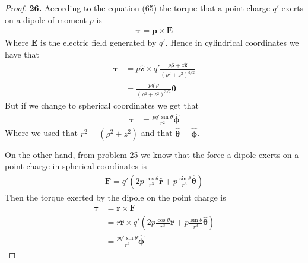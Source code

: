 \documentclass[11pt]{article}
\newcommand{\hatz}{\bm{\hat{z}}}
\newcommand{\hatrho}{\bm{\hat{\rho}}}
\newcommand{\hatphi}{\bm{\hat{\phi}}}
\newcommand{\hatr}{\bm{\hat{r}}}
\newcommand{\hattheta}{\bm{\hat{\theta}}}
\theoremstyle{definition}
\begin{document}
\cleardoublepage
\begin{proof}{\textbf{26.}}
    According to the equation (65) the torque that a point charge $q'$ exerts
    on a dipole of moment $p$ is
    \begin{align*}
        \bm{\tau} = \bm{p} \times \bm{E}
    \end{align*}
    Where $\bm{E}$ is the electric field generated by $q'$. Hence in
    cylindrical coordinates we have that
    \begin{align*}
        \bm{\tau} &= p\hatz \times q'\frac{\rho\hatrho + z\hatz}{(\rho^2 + z^2)^{3/2}}\\
        &= \frac{pq'\rho}{(\rho^2 + z^2)^{3/2}}\hattheta
    \end{align*}
    But if we change to spherical coordinates we get that
    \begin{align*}
        \bm{\tau} &= \frac{pq'\sin\theta}{r^2}\hatphi
    \end{align*}
    Where we used that $r^2 = (\rho^2 + z^2)$ and that $\hattheta = \hatphi$.
 
    On the other hand, from problem 25 we know that the force a dipole exerts
    on a point charge in spherical coordinates is
    \begin{align*}
        \bm{F} = q'\left(
            2p\frac{\cos\theta}{r^3}\hatr
            + p\frac{\sin\theta}{r^3}\hattheta
        \right)
    \end{align*}
    Then the torque exerted by the dipole on the point charge is
    \begin{align*}
        \bm{\tau} &= \bm{r} \times \bm{F}\\
        &= r\hatr \times q'\left(
            2p\frac{\cos\theta}{r^3}\hatr
            + p\frac{\sin\theta}{r^3}\hattheta
        \right)\\
        &= \frac{pq'\sin\theta}{r^2}\hatphi
    \end{align*}
\end{proof}
\cleardoublepage
\end{document}
